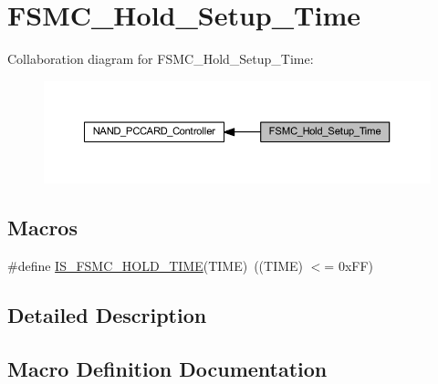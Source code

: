 \hypertarget{group___f_s_m_c___hold___setup___time}{}\section{F\+S\+M\+C\+\_\+\+Hold\+\_\+\+Setup\+\_\+\+Time}
\label{group___f_s_m_c___hold___setup___time}
Collaboration diagram for F\+S\+M\+C\+\_\+\+Hold\+\_\+\+Setup\+\_\+\+Time\+:
\nopagebreak
\begin{figure}[H]
\begin{center}
\leavevmode
\includegraphics[width=350pt]{group___f_s_m_c___hold___setup___time}
\end{center}
\end{figure}
\subsection*{Macros}
\begin{DoxyCompactItemize}
\item 
\#define \hyperlink{group___f_s_m_c___hold___setup___time_gab2abc8eb967495f2a2bafec8162d6385}{I\+S\+\_\+\+F\+S\+M\+C\+\_\+\+H\+O\+L\+D\+\_\+\+T\+I\+ME}(T\+I\+ME)~((T\+I\+ME) $<$= 0x\+F\+F)
\end{DoxyCompactItemize}


\subsection{Detailed Description}


\subsection{Macro Definition Documentation}
\mbox{\label{group___f_s_m_c___hold___setup___time_gab2abc8eb967495f2a2bafec8162d6385}} 
